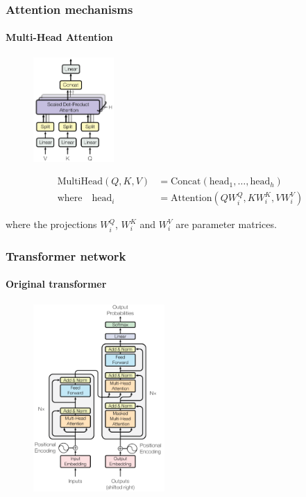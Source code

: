 \documentclass[9pt]{beamer}
\begin{document}
\begin{frame}

  \frametitle{Attention mechanisms}

  \framesubtitle{Multi-Head Attention}

  \begin{figure}
    \includegraphics[height = 4cm]{images/multi_head_attention.png}
  \end{figure}

  \begin{align*}
    \text{MultiHead}(Q, K, V) &= \text{Concat}(\text{head}_{1}, \dots, \text{head}_{h}) \\
    \text{where} \quad \text{head}_{i} &= \text{Attention}(QW^{Q}_{i}, KW^{K}_{i},
  VW^{V}_{i})
  \end{align*}

  \bigskip

  where the projections $W^{Q}_{i}$, $W^{K}_{i}$ and $W^{V}_{i}$ are
  parameter matrices.
\end{frame}

\begin{frame}

  \frametitle{Transformer network}

  \framesubtitle{Original transformer}

  \begin{figure}
    \includegraphics[width = 5cm]{images/base_transformer.png}
  \end{figure}

\end{frame}
\end{document}
